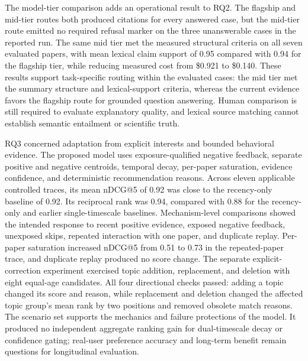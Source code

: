 The model-tier comparison adds an operational result to RQ2.
The flagship and mid-tier routes both produced citations for every answered case, but the mid-tier route emitted no required refusal marker on the three unanswerable cases in the reported run.
The same mid tier met the measured structural criteria on all seven evaluated papers, with mean lexical claim support of 0.95 compared with 0.94 for the flagship tier, while reducing measured cost from \$0.921 to \$0.140.
These results support task-specific routing within the evaluated cases: the mid tier met the summary structure and lexical-support criteria, whereas the current evidence favors the flagship route for grounded question answering.
Human comparison is still required to evaluate explanatory quality, and lexical source matching cannot establish semantic entailment or scientific truth.

RQ3 concerned adaptation from explicit interests and bounded behavioral evidence.
The proposed model uses exposure-qualified negative feedback, separate positive and negative centroids, temporal decay, per-paper saturation, evidence confidence, and deterministic recommendation reasons.
Across eleven applicable controlled traces, its mean nDCG@5 of 0.92 was close to the recency-only baseline of 0.92.
Its reciprocal rank was 0.94, compared with 0.88 for the recency-only and earlier single-timescale baselines.
Mechanism-level comparisons showed the intended response to recent positive evidence, exposed negative feedback, unexposed skips, repeated interaction with one paper, and duplicate replay.
Per-paper saturation increased nDCG@5 from 0.51 to 0.73 in the repeated-paper trace, and duplicate replay produced no score change.
The separate explicit-correction experiment exercised topic addition, replacement, and deletion with eight equal-age candidates. All four directional checks passed: adding a topic changed its score and reason, while replacement and deletion changed the affected topic group's mean rank by two positions and removed obsolete match reasons.
The scenario set supports the mechanics and failure protections of the model.
It produced no independent aggregate ranking gain for dual-timescale decay or confidence gating; real-user preference accuracy and long-term benefit remain questions for longitudinal evaluation.

